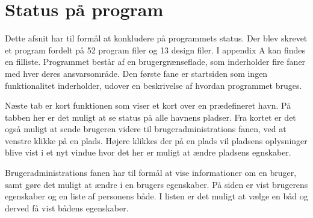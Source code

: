 \section{Status på program} 
\label{sec:status_p_program}

Dette afsnit har til formål at konkludere på programmets status. Der blev skrevet et program fordelt på 52 program filer og 13 design filer. I appendix A kan findes en filliste. Programmet består af en brugergrænseflade, som inderholder fire faner med hver deres ansvarsområde. Den første fane er startsiden som ingen funktionalitet inderholder, udover en beskrivelse af hvordan programmet bruges. 

Næste tab er kort funktionen som viser et kort over en prædefineret havn. På tabben her er det muligt at se status på alle havnens pladser. Fra kortet er det også muligt at sende brugeren videre til brugeradministrations fanen, ved at venstre klikke på en plads. Højere klikkes der på en plads vil pladsens oplysninger blive vist i et nyt vindue hvor det her er muligt at ændre pladsens egnskaber.  

Brugeradministrations fanen har til formål at vise informationer om en bruger, samt gøre det muligt at ændre i en brugers egenskaber. På siden er vist brugerens egenskaber og en liste af personens både. I listen er det muligt at vælge en båd og derved få vist bådens egenskaber. 

